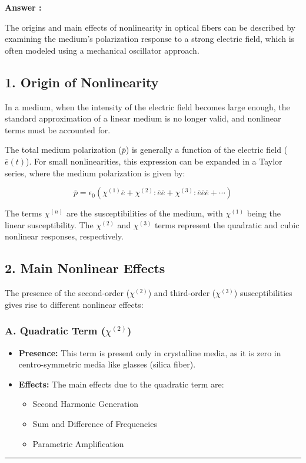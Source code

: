 \documentclass[a4paper,11pt]{book}
\newcounter{qacount}
\newenvironment{answer}{
  \noindent\textbf{Answer \theqacount:}\space
}{
  \par\vspace{1em}   %
  \hrule             %
  \vspace{0.5em}     %
}
\begin{document}
\begin{answer}
    The origins and main effects of nonlinearity in optical fibers can be described by examining the medium's polarization response to a strong electric field, which is often modeled using a mechanical oscillator approach.

    \subsection*{1. Origin of Nonlinearity}

    In a medium, when the intensity of the electric field becomes large enough, the standard approximation of a linear medium is no longer valid, and nonlinear terms must be accounted for.

    The total medium polarization ($\overline{p}$) is generally a function of the electric field ($\overline{e}(t)$). For small nonlinearities, this expression can be expanded in a Taylor series, where the medium polarization is given by:

    \begin{equation}
        \overline{p}=\epsilon_{0}(\chi^{(1)}\overline{e}+\chi^{(2)}:\overline{e}\overline{e}+\chi^{(3)}:\overline{e}\overline{e}\overline{e}+\cdots)
    \end{equation}

    The terms $\chi^{(n)}$ are the susceptibilities of the medium, with $\chi^{(1)}$ being the linear susceptibility. The $\chi^{(2)}$ and $\chi^{(3)}$ terms represent the quadratic and cubic nonlinear responses, respectively.

    \subsection*{2. Main Nonlinear Effects}

    The presence of the second-order ($\chi^{(2)}$) and third-order ($\chi^{(3)}$) susceptibilities gives rise to different nonlinear effects:

    \subsubsection*{A. Quadratic Term ($\chi^{(2)}$)}
    \begin{itemize}
        \item \textbf{Presence:} This term is present only in crystalline media, as it is zero in centro-symmetric media like glasses (silica fiber).
        \item \textbf{Effects:} The main effects due to the quadratic term are:
              \begin{itemize}
                  \item Second Harmonic Generation
                  \item Sum and Difference of Frequencies
                  \item Parametric Amplification
              \end{itemize}
    \end{itemize}


\end{answer}
\end{document}
